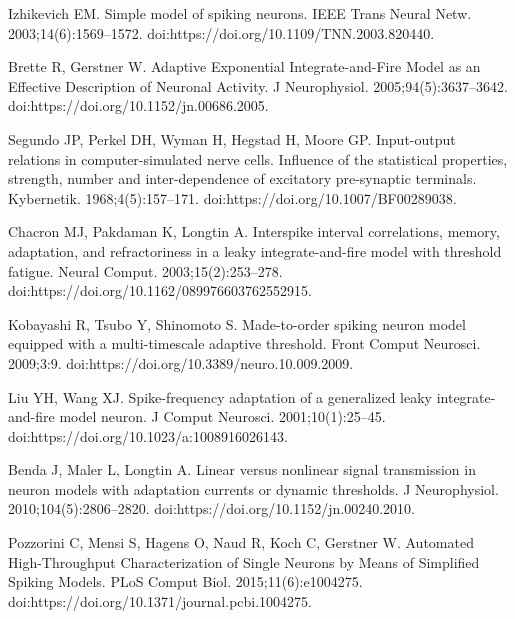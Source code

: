 \documentclass[10pt,letterpaper]{article}
\begin{document}
\begin{thebibliography}{100}
  Izhikevich EM.
  \newblock Simple model of spiking neurons.
  \newblock IEEE Trans Neural Netw. 2003;14(6):1569--1572.
  \newblock doi:{https://doi.org/10.1109/TNN.2003.820440}.
  
  Brette R, Gerstner W.
  \newblock Adaptive {Exponential} {Integrate}-and-{Fire} {Model} as an
    {Effective} {Description} of {Neuronal} {Activity}.
  \newblock J Neurophysiol. 2005;94(5):3637--3642.
  \newblock doi:{https://doi.org/10.1152/jn.00686.2005}.
  
  Segundo JP, Perkel DH, Wyman H, Hegstad H, Moore GP.
  \newblock Input-output relations in computer-simulated nerve cells. Influence
    of the statistical properties, strength, number and inter-dependence of
    excitatory pre-synaptic terminals.
  \newblock Kybernetik. 1968;4(5):157--171.
  \newblock doi:{https://doi.org/10.1007/BF00289038}.
  
  Chacron MJ, Pakdaman K, Longtin A.
  \newblock Interspike interval correlations, memory, adaptation, and
    refractoriness in a leaky integrate-and-fire model with threshold fatigue.
  \newblock Neural Comput. 2003;15(2):253--278.
  \newblock doi:{https://doi.org/10.1162/089976603762552915}.
  
  Kobayashi R, Tsubo Y, Shinomoto S.
  \newblock Made-to-order spiking neuron model equipped with a multi-timescale
    adaptive threshold.
  \newblock Front Comput Neurosci. 2009;3:9.
  \newblock doi:{https://doi.org/10.3389/neuro.10.009.2009}.
  
  Liu YH, Wang XJ.
  \newblock Spike-frequency adaptation of a generalized leaky integrate-and-fire
    model neuron.
  \newblock J Comput Neurosci. 2001;10(1):25--45.
  \newblock doi:{https://doi.org/10.1023/a:1008916026143}.
  
  Benda J, Maler L, Longtin A.
  \newblock Linear versus nonlinear signal transmission in neuron models with
    adaptation currents or dynamic thresholds.
  \newblock J Neurophysiol. 2010;104(5):2806--2820.
  \newblock doi:{https://doi.org/10.1152/jn.00240.2010}.
  
  Pozzorini C, Mensi S, Hagens O, Naud R, Koch C, Gerstner W.
  \newblock Automated {High-Throughput} Characterization of Single Neurons by
    Means of Simplified Spiking Models.
  \newblock PLoS Comput Biol. 2015;11(6):e1004275.
  \newblock doi:{https://doi.org/10.1371/journal.pcbi.1004275}.
  

\end{thebibliography}
\end{document}
